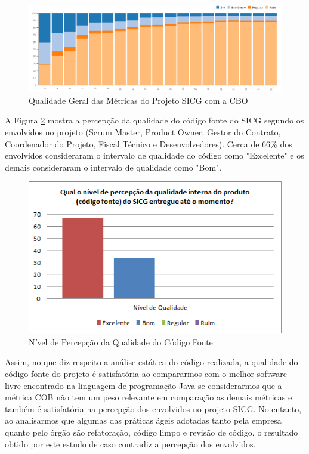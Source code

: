 \begin{figure}[H]
		\centering
			\includegraphics[scale=0.5]{figuras/todasmetricasComCOB.png}
		\caption{Qualidade Geral das Métricas do Projeto SICG com a CBO}
		\label{qualidadesprint2}
\end{figure}


A Figura \ref{percepcaoqualidade} mostra a percepção da qualidade do código fonte do SICG segundo os envolvidos no projeto (Scrum Master, Product Owner, Gestor do Contrato, Coordenador do Projeto, Fiscal Técnico e Desenvolvedores). Cerca de 66\% dos envolvidos consideraram  o intervalo de qualidade do código como "Excelente" e os demais consideraram
o intervalo de qualidade como "Bom".

\begin{figure}[H]
		\centering
			\includegraphics[scale=1.0]{figuras/percepcaoqualidade.png}
		\caption{Nível de Percepção da Qualidade do Código Fonte}
		\label{percepcaoqualidade}
\end{figure}

Assim, no que diz respeito a análise estática do código realizada, a qualidade do código fonte do projeto é satisfatória ao compararmos com o melhor software livre encontrado na linguagem de programação Java se considerarmos que a métrica COB não tem um peso relevante em comparação as demais métricas e também é satisfatória na percepção dos envolvidos no projeto SICG. No entanto, ao analisarmos que algumas das práticas ágeis adotadas tanto pela empresa quanto pelo órgão são refatoração, código limpo e revisão de código, o resultado obtido por este estudo de caso contradiz a percepção dos envolvidos.



